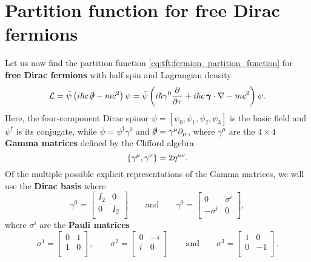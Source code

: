 \section{Partition function for free Dirac fermions}

Let us now find the partition function \eqref{eq:tft:fermion_partition_function} for \textbf{free Dirac fermions} with half spin and Lagrangian density
\begin{equation}
	\mathcal{L} = \bar\psi \left( i \hbar c \, \slashed\partial - m c^2 \right) \psi
	      = \bar\psi \left( i \hbar \gamma^0 \pdv{}{\tau} + i \hbar c \, {\bm{\gamma}} \cdot \nabla - m c^2 \right) \psi .
\label{eq:tft:dirac_lagrangian}
\end{equation}
Here, the four-component Dirac spinor $\psi = [ \psi_0, \psi_1, \psi_2, \psi_3 ] $ is the basic field and $\psi^\dagger$ is its conjugate, while $\bar\psi = \psi^\dagger \gamma^0$ and $\slashed\partial = \gamma^\mu \partial_\mu$, where $\gamma^\mu$ are the $4 \times 4$ \textbf{Gamma matrices} defined by the Clifford algebra
\begin{equation}
	\{ \gamma^\mu , \gamma^\nu \} = 2 \eta^{\mu \nu} .
\end{equation}
Of the multiple possible explicit representations of the Gamma matrices, we will use the \textbf{Dirac basis} where
\begin{equation}
	\gamma^0 = \begin{bmatrix} I_2 & 0 \\ 0 & I_2 \\ \end{bmatrix}
	\qquad \text{and} \qquad
	\gamma^0 = \begin{bmatrix} 0 & \sigma^i \\ -\sigma^i & 0 \\ \end{bmatrix} ,
\label{eq:tft:gamma_dirac_basis}
\end{equation}
where $\sigma^i$ are the \textbf{Pauli matrices}
\begin{equation}
	\sigma^1 = \begin{bmatrix} 0 & 1 \\ 1 & 0 \\ \end{bmatrix} ,
	\qquad
	\sigma^2 = \begin{bmatrix} 0 & -i \\ i & 0 \\ \end{bmatrix}
	\qquad \text{and} \qquad
	\sigma^3 = \begin{bmatrix} 1 & 0 \\ 0 & -1 \\ \end{bmatrix} .
\label{eq:tft:pauli_matrices}
\end{equation}

